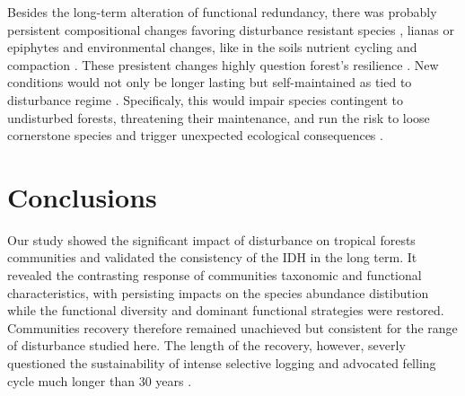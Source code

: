 \documentclass[fleqn,10pt]{ArtEcoFoG} %
\theoremstyle{definition}
\theoremstyle{definition}
\theoremstyle{definition}
\theoremstyle{remark}
\begin{document}
Besides the long-term alteration of functional redundancy, there was
probably persistent compositional changes favoring disturbance resistant
species \citep{Haddad2008}, lianas or epiphytes \citep{Martin2013} and
environmental changes, like in the soils nutrient cycling and compaction
\citep{Olander2005}. These presistent changes highly question forest's
resilience \citep{Chazdon2003a}. New conditions would not only be longer
lasting but self-maintained as tied to disturbance regime
\citep{Burslem2000}. Specificaly, this would impair species contingent
to undisturbed forests, threatening their maintenance, and run the risk
to loose cornerstone species and trigger unexpected ecological
consequences \citep{Jones1994, Diaz2005, Gardner2007}.

\section{Conclusions}\label{conclusions}

Our study showed the significant impact of disturbance on tropical
forests communities and validated the consistency of the IDH in the long
term. It revealed the contrasting response of communities taxonomic and
functional characteristics, with persisting impacts on the species
abundance distibution while the functional diversity and dominant
functional strategies were restored. Communities recovery therefore
remained unachieved but consistent for the range of disturbance studied
here. The length of the recovery, however, severly questioned the
sustainability of intense selective logging and advocated felling cycle
much longer than 30 years \citep{Gourlet-Fleury2005}.



\makeatletter

\makeatother


\end{document}
